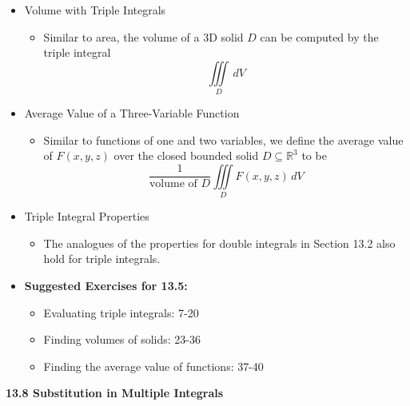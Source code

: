 \documentclass[12pt]{article}
\theoremstyle{plain}
\theoremstyle{definition}
\theoremstyle{remark}
\begin{document}
\begin{itemize}
	\item Volume with Triple Integrals
	
		\begin{itemize}
		\item Similar to area, the volume of a 3D solid $D$ can be computed by the triple integral \[\iiint\limits_D\, dV \]
		\end{itemize}
		
	\item Average Value of a Three-Variable Function
	
		\begin{itemize}
		\item Similar to functions of one and two variables, we define the average value of $F(x,y,z)$ over the closed bounded solid $D\subseteq \mathbb{R}^3$ to be \[\frac{1}{\text{volume of } D} \iiint\limits_D F(x,y,z)\, dV\]
		\end{itemize}
		
	\item Triple Integral Properties
	
		\begin{itemize}
		\item The analogues of the properties for double integrals in Section 13.2 also hold for triple integrals.
		\end{itemize}
				
	\item \textbf{Suggested Exercises for 13.5:}
	
		\begin{itemize}
		\item Evaluating triple integrals: 7-20
		\item Finding volumes of solids: 23-36
		\item Finding the average value of functions: 37-40
		\end{itemize}
		
	\end{itemize}
	
	\newpage
	
	\centerline{\bf 13.8 Substitution in Multiple Integrals}
	
\end{document}
